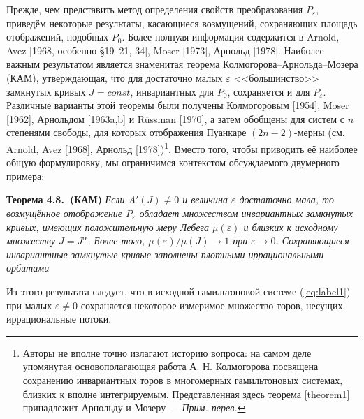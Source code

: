 \documentclass[twoside, a4paper]{article}
\begin{document}
Прежде, чем представить метод определения свойств преобразования $P_\varepsilon$, приведём некоторые результаты, касающиеся возмущений, сохраняющих площадь отображений, подобных $P_0$. Более полнуая информация содержится в Arnold, Avez [1968, особенно \S 19--21, 34], Moser [1973], Арнольд [1978]. Наиболее важным результатом является знаменитая теорема Колмогорова--Арнольда--Мозера (КАМ), утверждающая, что для достаточно малых $\varepsilon$ <<большинство>> замкнутых кривых $J=const$, инвариантных для $P_0$, сохраняется и для $P_\varepsilon$. Различные варианты этой теоремы были получены Колмогоровым [1954], Moser [1962], Арнольдом [1963a,b] и Rüssman [1970], а затем обобщены для систем с $n$ степенями свободы, для которых отображения Пуанкаре $(2n-2)$-мерны (см. Arnold, Avez [1968], Арнольд [1978])\footnote{Авторы не вполне точно излагают историю вопроса: на самом деле упомянутая основополагающая работа А. Н. Колмогорова посвящена сохранению инвариантных торов в многомерных гамильтоновых системах, близких к вполне интегрируемым. Представленная здесь теорема \ref{theorem1} принадлежит Арнольду и Мозеру --- \emph{Прим. перев.}}. Вместо того, чтобы приводить её наиболее общую формулировку, мы ограничимся контекстом обсуждаемого двумерного примера:
\renewcommand{\theteoremc}{4.8.\arabic{teoremc}}
\newcommand{\mytheorem}[2][]{\par\vspace{0.4cm}\refstepcounter{teoremc} \textbf{Теорема \theteoremc ~#1} {\emph{#2}}\vspace{0.4cm}}
\mytheorem[(КАМ)]{Если $A'(J)\neq 0$  и величина $\varepsilon$ достаточно мала, то возмущённое отображение $P_\varepsilon$ обладает множеством инвариантных замкнутых кривых, имеющих положительную меру Лебега $\mu (\varepsilon )$ и близких к исходному множеству $J = J^\alpha$. Более того, $\mu (\varepsilon)/\mu(J)\to 1$ при $\varepsilon \to 0$. Сохраняющиеся инвариантные замкнутые кривые заполнены плотными иррациональными орбитами}\label{theorem1}

Из этого результата следует, что в исходной гамильтоновой системе (\ref{eq:label1}) при малых $\varepsilon \neq 0$ сохраняется некоторое измеримое множество торов, несущих иррациональные потоки.
\end{document}
